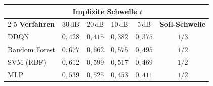 \begin{tabular}{lccccc}
\toprule
 & \multicolumn{4}{c}{\textbf{Implizite Schwelle $t$}} & \\
\cmidrule(lr){2-5}
\textbf{Verfahren} & 30\,dB & 20\,dB & 10\,dB & 5\,dB & \textbf{Soll-Schwelle} \\
\midrule
DDQN & $0{,}428$ & $0{,}415$ & $0{,}382$ & $0{,}375$ & $1/3$ \\
Random Forest & $0{,}677$ & $0{,}662$ & $0{,}575$ & $0{,}495$ & $1/2$ \\
SVM (RBF) & $0{,}612$ & $0{,}599$ & $0{,}517$ & $0{,}469$ & $1/2$ \\
MLP & $0{,}539$ & $0{,}525$ & $0{,}453$ & $0{,}411$ & $1/2$ \\
\bottomrule
\end{tabular}
